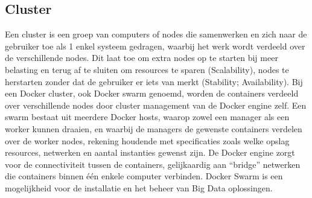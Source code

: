 \subsection{Cluster}
Een cluster is een groep van computers of nodes die samenwerken en zich naar de gebruiker toe als 1 enkel systeem gedragen, waarbij het werk wordt verdeeld over de verschillende nodes. Dit laat toe om extra nodes op te starten bij meer belasting en terug af te sluiten om resources te sparen (Scalability), nodes te herstarten zonder dat de gebruiker er iets van merkt (Stability; Availability).\textcite{Nordhoff2020}
\newline
\newline
Bij een Docker cluster, ook Docker swarm genoemd, worden de containers verdeeld over verschillende nodes door cluster management van de Docker engine zelf. Een swarm bestaat uit meerdere Docker hosts, waarop zowel een manager als een worker kunnen draaien, en waarbij de managers de gewenste containers verdelen over de worker nodes, rekening houdende met specificaties zoals welke opslag resources, netwerken en aantal instanties gewenst zijn. De Docker engine zorgt voor de connectiviteit tussen de containers, gelijkaardig aan ``bridge'' netwerken die containers binnen één enkele computer verbinden.\textcite{Docker2023b}
\newline
\newline
Docker Swarm is een mogelijkheid voor de installatie en het beheer van Big Data oplossingen.
\newline
\newline



